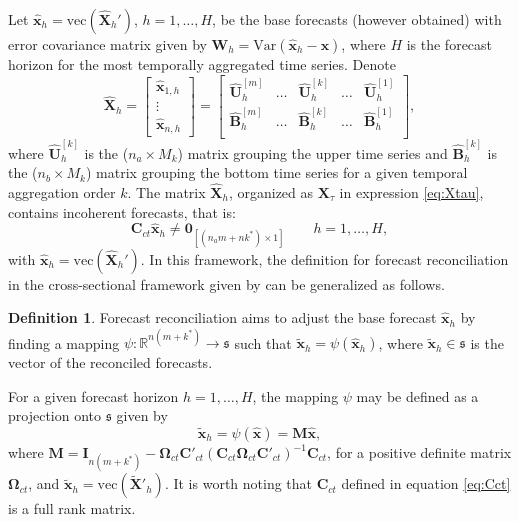 \documentclass[a4paper,11pt]{article}
\newcommand{\xvet}{\bm{x}}
\newcommand{\Bvet}{\bm{B}}
\newcommand{\Cvet}{\bm{C}}
\newcommand{\Ivet}{\bm{I}}
\newcommand{\Mvet}{\bm{M}}
\newcommand{\Uvet}{\bm{U}}
\newcommand{\Xvet}{\bm{X}}
\newcommand{\Zerovet}{\bm{0}}
\newcommand{\Omegavet}{\bm{\Omega}}
\theoremstyle{definition}
\newtheorem{definition}{Definition}[section]
\begin{document}
Let $\widehat{\xvet}_{h} = \mathrm{vec}(\widehat{\Xvet}_{h}')$, $h = 1, \dots, H$, be the base forecasts (however obtained) with error covariance matrix given by $\bm{W}_h = \text{Var}(\widehat{\xvet}_h - \xvet)$, where $H$ is the forecast horizon for the most temporally aggregated time series. Denote
$$
	\widehat{\Xvet}_{h} = \begin{bmatrix}
		\widehat{\xvet}_{1,h} \\
		\vdots                \\
		\widehat{\xvet}_{n,h}
	\end{bmatrix} =\begin{bmatrix}
		\widehat{\Uvet}_{h}^{[m]} & \dots & \widehat{\Uvet}_{h}^{[k]} & \dots & \widehat{\Uvet}_{h}^{[1]} \\[0.25cm]
		\widehat{\Bvet}_{h}^{[m]} & \dots & \widehat{\Bvet}_{h}^{[k]} & \dots & \widehat{\Bvet}_{h}^{[1]} \\\end{bmatrix},
$$
where $\widehat{\Uvet}_{h}^{[k]}$ is the ($n_a\times M_k$) matrix grouping the upper time series and $\widehat{\Bvet}_{h}^{[k]}$ is the ($n_b\times M_k$) matrix grouping the bottom time series for a given temporal aggregation order $k$. The matrix $\widehat{\Xvet}_{h}$, organized as ${\Xvet}_{\tau}$ in expression \eqref{eq:Xtau}, contains incoherent forecasts, that is:
$$
	\Cvet_{ct} \widehat{\xvet}_{h} \neq \Zerovet_{[(n_am+nk^\ast)\times1]} \qquad h = 1, \dots, H,
$$
with $\widehat{\xvet}_{h} = \mathrm{vec}(\widehat{\Xvet}_{h}')$. In this framework, the definition for forecast reconciliation in the cross-sectional framework given by \cite{panagiotelis2021} can be generalized as follows.
\begin{definition}
	Forecast reconciliation aims to adjust the base forecast $\widehat{\xvet}_{h}$ by finding a mapping $\psi: \mathbb{R}^{n(m+k^\ast)} \rightarrow \mathfrak{s}$ such that $\widetilde{\xvet}_{h} = \psi\left(\widehat{\xvet}_{h}\right)$, where $\widetilde{\xvet}_{h} \in \mathfrak{s}$ is the vector of the reconciled forecasts.
\end{definition}

For a given forecast horizon $h = 1,\dots, H$, the mapping $\psi$ may be defined as a projection onto $\mathfrak{s}$ given by \citep{panagiotelis2021, difonzo2023}
\begin{equation}
	\label{eq:Mvet}
	\widetilde{\xvet}_{h} = \psi\left(\widehat{\xvet}\right) = \Mvet \widehat{\xvet},
\end{equation}
where $\Mvet = \Ivet_{n(m+ k^\ast)} - \Omegavet_{ct}\Cvet'_{ct}\left(\Cvet_{ct}\Omegavet_{ct}\Cvet'_{ct}\right)^{-1}\Cvet_{ct}$, for a positive definite matrix $\Omegavet_{ct}$, and $\widetilde{\xvet}_{h} = \mathrm{vec}(\widetilde{\Xvet}'_{h})$. It is worth noting that $\Cvet_{ct}$ defined in equation \eqref{eq:Cct} is a full rank matrix.
\end{document}
